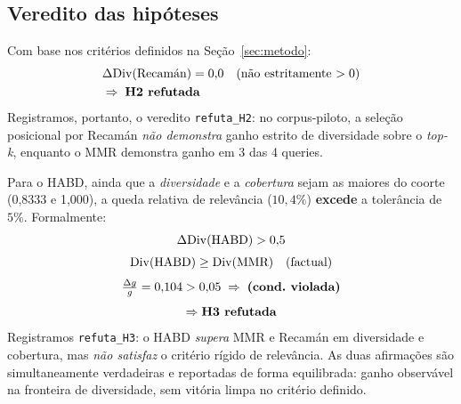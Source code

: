 \subsection{Veredito das hipóteses}

Com base nos critérios definidos na Seção~\ref{sec:metodo}:
\[
\begin{aligned}
&\Delta\mathrm{Div}(\text{Recam\'an}) = 0{,}0
  \quad \text{(n\~ao estritamente $>0$)}\\
&\Rightarrow\; \textbf{H2 refutada}
\end{aligned}
\]
Registramos, portanto, o veredito \texttt{refuta\_H2}: no corpus-piloto, a
seleção posicional por Recamán \emph{não demonstra} ganho estrito de diversidade
sobre o \emph{top-k}, enquanto o MMR demonstra ganho em 3 das 4 queries.

Para o HABD, ainda que a \emph{diversidade} e a \emph{cobertura} sejam as maiores
do coorte (0{,}8333 e 1{,}000), a queda relativa de relevância
($10{,}4\%$) \textbf{excede} a tolerância de $5\%$. Formalmente:
\[
\begin{gathered}
\Delta\mathrm{Div}(\text{HABD}) > 0{,}5\\[3pt]
\mathrm{Div}(\text{HABD}) \ge \mathrm{Div}(\text{MMR}) \quad \text{(factual)}\\[3pt]
\tfrac{\Delta g}{g} = 0{,}104 > 0{,}05 \;\Rightarrow\; \textbf{(cond.\ violada)}\\[3pt]
\Rightarrow \textbf{H3 refutada}
\end{gathered}
\]
Registramos \texttt{refuta\_H3}: o HABD \emph{supera} MMR e Recamán em diversidade
e cobertura, mas \emph{não satisfaz} o critério rígido de relevância. As duas
afirmações são simultaneamente verdadeiras e reportadas de forma equilibrada:
ganho observável na fronteira de diversidade, sem vitória limpa no critério
definido.
